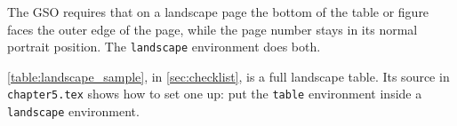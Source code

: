 The GSO requires that on a landscape page the bottom of the table or figure faces the outer edge of the page, while the page number stays in its normal portrait position. The \texttt{landscape} environment does both.

\cref{table:landscape_sample}, in \cref{sec:checklist}, is a full landscape table. Its source in \texttt{chapter5.tex} shows how to set one up: put the \texttt{table} environment inside a \texttt{landscape} environment.
